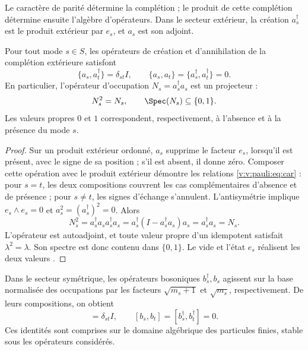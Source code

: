 Le caractère de parité détermine la complétion ; le produit de cette
complétion détermine ensuite l’algèbre d’opérateurs. Dans le
secteur extérieur, la création \(a_s^\dagger\) est le produit extérieur par
\(e_s\), et \(a_s\) est son adjoint.

\begin{theorem}
\label{v:v:rec:completaciones:statement:01}
\label{v:v:rec:thm:principio-exclusion-pauli}
Pour tout mode \(s\in S\), les opérateurs de création et d’annihilation de la
complétion extérieure satisfont
\begin{equation}
 \{a_s,a_t^\dagger\}=\delta_{st}I,
 \qquad
 \{a_s,a_t\}=\{a_s^\dagger,a_t^\dagger\}=0.
 \label{v:v:pauli:eq:car}
\end{equation}
En particulier, l’opérateur d’occupation
\(N_s=a_s^\dagger a_s\) est un projecteur :
\begin{equation}
 N_s^2=N_s,
 \qquad \Spec(N_s)\subseteq\{0,1\}.
 \label{v:v:pauli:eq:proyeccion-ocupacion}
\end{equation}
Les valeurs propres \(0\) et \(1\) correspondent, respectivement, à l’absence
et à la présence du mode \(s\).
\end{theorem}

\begin{proof}
Sur un produit extérieur ordonné, \(a_s\) supprime le facteur \(e_s\), lorsqu’il est
présent, avec le signe de sa position ; s’il est absent, il donne zéro. Composer
cette opération avec le produit extérieur démontre les relations
\eqref{v:v:pauli:eq:car} : pour \(s=t\), les deux compositions couvrent les cas
complémentaires d’absence et de présence ; pour \(s\ne t\), les signes
d’échange s’annulent. L’antisymétrie implique
\(e_s\wedge e_s=0\) et
\(a_s^2=(a_s^\dagger)^2=0\). Alors
\begin{equation}
 N_s^2=a_s^\dagger a_s a_s^\dagger a_s
 =a_s^\dagger(I-a_s^\dagger a_s)a_s
 =a_s^\dagger a_s=N_s.
 \label{v:v:pauli:eq:prueba-idempotencia}
\end{equation}
L’opérateur est autoadjoint, et toute valeur propre d’un idempotent satisfait
\(\lambda^2=\lambda\). Son spectre est donc contenu dans
\(\{0,1\}\). Le vide et l’état \(e_s\) réalisent les deux valeurs
\cite{v:Pauli1925,v:Dirac1926}.
\end{proof}

Dans le secteur symétrique, les opérateurs bosoniques \(b_s^\dagger,b_s\)
agissent sur la base normalisée des occupations par les facteurs
\(\sqrt{m_s+1}\) et \(\sqrt{m_s}\), respectivement. De leurs compositions,
on obtient
\begin{equation}
 [b_s,b_t^\dagger]=\delta_{st}I,
 \qquad [b_s,b_t]=[b_s^\dagger,b_t^\dagger]=0.
 \label{v:v:pauli:eq:ccr}
\end{equation}
Ces identités sont comprises sur le domaine algébrique des particules
finies, stable sous les opérateurs considérés.

